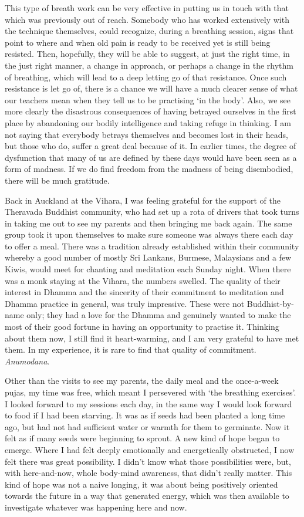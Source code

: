 This type of breath work can be very effective in putting us in touch
with that which was previously out of reach. Somebody who has worked
extensively with the technique themselves, could recognize, during a
breathing session, signs that point to where and when old pain is ready
to be received yet is still being resisted. Then, hopefully, they will
be able to suggest, at just the right time, in the just right manner, a
change in approach, or perhaps a change in the rhythm of breathing,
which will lead to a deep letting go of that resistance. Once such
resistance is let go of, there is a chance we will have a much clearer sense of what our
teachers mean when they tell us to be practising `in the body'. Also, we
see more clearly the disastrous consequences of having betrayed
ourselves in the first place by abandoning our bodily intelligence and
taking refuge in thinking. I am not saying that everybody betrays
themselves and becomes lost in their heads, but those who do, suffer a
great deal because of it. In earlier times, the degree of dysfunction
that many of us are defined by these days would have been seen as a form
of madness. If we do find freedom from the madness of being disembodied,
there will be much gratitude.

Back in Auckland at the Vihara, I was feeling grateful for the support
of the Theravada Buddhist community, who had set up a rota of drivers
that took turns in taking me out to see my parents and then bringing me
back again. The same group took it upon themselves to make sure someone
was always there each day to offer a meal. There was a tradition already
established within their community whereby a good number of mostly Sri
Lankans, Burmese, Malaysians and a few Kiwis, would meet for chanting
and meditation each Sunday night. When there was a monk staying at the
Vihara, the numbers swelled. The quality of their interest in Dhamma and
the sincerity of their commitment to meditation and Dhamma practice in
general, was truly impressive. These were not Buddhist-by-name only;
they had a love for the Dhamma and genuinely wanted to make the most of
their good \mbox{fortune} in having an opportunity to practise it. Thinking
about them now, I still find it heart-warming, and I am very grateful to
have met them. In my experience, it is rare to find that quality of
commitment. \emph{Anumodana}.

Other than the visits to see my parents, the daily meal and the
once-a-week pujas, my time was free, which meant I persevered with `the
breathing exercises'. I looked forward to my sessions each day, in the
same way I would look forward to food if I had been starving. It was as
if seeds had been planted a long time ago, but had not had sufficient
water or warmth for them to germinate. Now it felt as if many seeds were
beginning to sprout. A new kind of hope began to emerge. Where I had
felt deeply emotionally and energetically obstructed, I now felt there
was great possibility. I didn't know what those possibilities were, but,
with here-and-now, whole body-mind awareness, that didn't really matter.
This kind of hope was not a naive longing, it was about being positively
oriented towards the future in a way that generated energy, which was
then available to investigate whatever was happening here and now.

